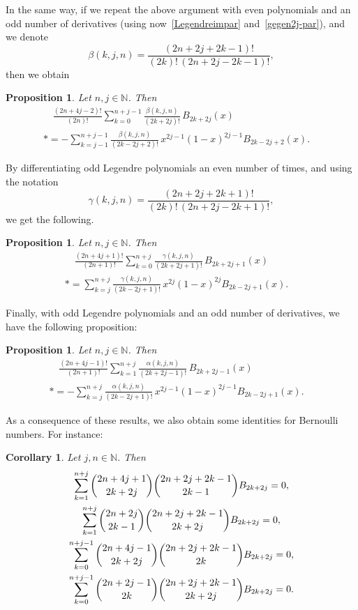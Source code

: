 \documentclass[a4paper,reqno]{amsart}
\newcommand{\N}{\mathbb{N}}
\theoremstyle{plain}
\newtheorem{Prop}[Teor]{Proposition}
\newtheorem{Cor}[Teor]{Corollary}
\numberwithin{equation}{section}
\theoremstyle{remark}
\begin{document}
In the same way, if we repeat the above argument with even polynomials and an odd number of derivatives (using now~\eqref{Legendreimpar} and~\eqref{gegen2j-par}), and we denote
\[
  \beta(k,j,n) = \frac{(2n+2j+2k-1)!}{(2k)!\,(2n+2j-2k-1)!},
\]
then we obtain 


\begin{Prop} 
\label{Prop:diamanteparimpar}
Let $n,j\in\N$. Then
\begin{multline*}
  \quad
  \frac{(2n+4j-2)!}{(2n)!} \sum_{k=0}^{n+j-1} \frac{\beta(k,j,n)}{(2k+2j)!}\,B_{2k+2j}(x)
  \\* 
  = -\sum_{k=j-1}^{n+j-1} \frac{\beta(k,j,n)}{(2k-2j+2)!} \, x^{2j-1} (1-x)^{2j-1} B_{2k-2j+2}(x).
  \quad
\end{multline*}
\end{Prop}

By differentiating odd Legendre polynomials an even number of times, and using the notation
\[
  \gamma(k,j,n) = \frac{(2n+2j+2k+1)!}{(2k)!\,(2n+2j-2k+1)!},
\]
we get the following.

\begin{Prop} 
\label{Prop:diamanteimparpar}
Let $n,j\in\N$. Then
\begin{multline*}
  \quad
  \frac{(2n+4j+1)!}{(2n+1)!} \sum_{k=0}^{n+j} \frac{\gamma(k,j,n)}{(2k+2j+1)!}\,B_{2k+2j+1}(x)
  \\*
  = \sum_{k=j}^{n+j} \frac{\gamma(k,j,n)}{(2k-2j+1)!} \, x^{2j} (1-x)^{2j} B_{2k-2j+1}(x).
  \quad
\end{multline*}
\end{Prop}

Finally, with odd Legendre polynomials and an odd number of derivatives, we have the following proposition:

\begin{Prop} 
\label{Prop:diamanteimparimpar}
Let $n,j\in\N$. Then
\begin{multline*}
  \quad
  \frac{(2n+4j-1)!}{(2n+1)!} \sum_{k=1}^{n+j} \frac{\alpha(k,j,n)}{(2k+2j-1)!}\,B_{2k+2j-1}(x)
  \\*
  = -\sum_{k=j}^{n+j} \frac{\alpha(k,j,n)}{(2k-2j+1)!} \, x^{2j-1} (1-x)^{2j-1} B_{2k-2j+1}(x).
  \quad
\end{multline*}
\end{Prop}

As a consequence of these results, we also obtain some identities for Bernoulli numbers. For instance: 

\begin{Cor} 
Let $j,n\in\N$. Then
\begin{gather*}
  \sum_{k=1}^{n+j} \dbinom{2n+4j+1}{2k+2j} \dbinom{2n+2j+2k-1}{2k-1}B_{2k+2j} = 0,
  \\
  \sum_{k=1}^{n+j} \dbinom{2n+2j}{2k-1} \dbinom{2n+2j+2k-1}{2k+2j}B_{2k+2j} = 0,
  \\
  \sum_{k=0}^{n+j-1} \dbinom{2n+4j-1}{2k+2j} \dbinom{2n+2j+2k-1}{2k}B_{2k+2j} = 0,
  \\
  \sum_{k=0}^{n+j-1} \dbinom{2n+2j-1}{2k} \dbinom{2n+2j+2k-1}{2k+2j}B_{2k+2j} = 0.
\end{gather*}
\end{Cor}
\end{document}
